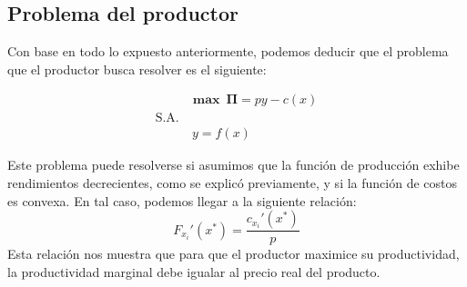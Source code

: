 \documentclass[11pt]{article}
\begin{document}
\subsection{Problema del productor}

\begin{flushleft}
    Con base en todo lo expuesto anteriormente, podemos deducir que el problema que el productor busca resolver es el siguiente:

    \begin{center}
        \begin{align*}
            & \boldsymbol{\max ~ \Pi} = py-c(x)\\
            \text{S.A.} \\ &~ y = f(x)
        \end{align*}
    \end{center}
    Este problema puede resolverse si asumimos que la función de producción exhibe rendimientos decrecientes, como se explicó previamente, y si la función de costos es convexa. En tal caso, podemos llegar a la siguiente relación:
    $$F_{x_i}'(x^*) = \frac{c_{x_i}'(x^*)}{p}$$
    Esta relación nos muestra que para que el productor maximice su productividad, la productividad marginal debe igualar al precio real del producto.
\end{flushleft}

\newpage
\medskip

\nocite{*}
 

\newpage
\end{document}
